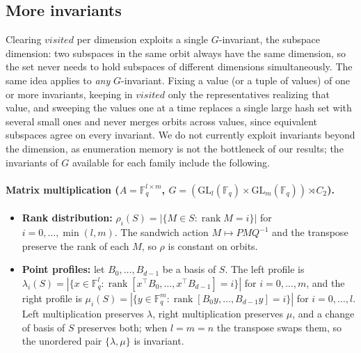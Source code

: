 \documentclass[11pt]{article}
\theoremstyle{definition}
\newcommand{\F}{\mathbb{F}}
\newcommand{\GL}{\mathrm{GL}}
\newcommand{\rank}{\operatorname{rank}}
\begin{document}
\subsection*{More invariants}\label{app:invariants}

Clearing $\textit{visited}$ per dimension exploits a single $G$-invariant, the
subspace dimension: two subspaces in the same orbit always have the same
dimension, so the set never needs to hold subspaces of different dimensions
simultaneously. The same idea applies to \emph{any} $G$-invariant. Fixing a value
(or a tuple of values) of one or more invariants, keeping in $\textit{visited}$
only the representatives realizing that value, and sweeping the values one at a
time replaces a single large hash set with several small ones and never merges
orbits across values, since equivalent subspaces agree on every invariant. We do
not currently exploit invariants beyond the dimension, as enumeration memory is
not the bottleneck of our results; the invariants of $G$ available for each family
include the following.

\paragraph{Matrix multiplication ($A=\F_q^{l\times m}$, $G=(\GL_l(\F_q)\times\GL_m(\F_q))\rtimes C_2$).}
\begin{itemize}
  \item \textbf{Rank distribution:} $\rho_i(S)=|\{M\in S:\rank M=i\}|$ for
    $i=0,\dots,\min(l,m)$. The sandwich action $M\mapsto PMQ^{-1}$ and the
    transpose preserve the rank of each $M$, so $\rho$ is constant on orbits.
  \item \textbf{Point profiles:} let $B_0,\dots,B_{d-1}$ be a basis of $S$. The
    left profile is
    $\lambda_i(S)=|\{x\in\F_q^{l}:\rank[x^\top B_0,\dots,x^\top B_{d-1}]=i\}|$ for
    $i=0,\dots,m$, and the right profile is
    $\mu_i(S)=|\{y\in\F_q^{m}:\rank[B_0y,\dots,B_{d-1}y]=i\}|$ for $i=0,\dots,l$.
    Left multiplication preserves $\lambda$, right multiplication preserves $\mu$,
    and a change of basis of $S$ preserves both; when $l=m=n$ the transpose swaps
    them, so the unordered pair $\{\lambda,\mu\}$ is invariant.
\end{itemize}
\end{document}
